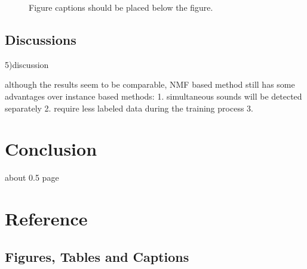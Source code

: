\documentclass{article}
\begin{document}
\begin{figure}
 \centerline{}
 \caption{Figure captions should be placed below the figure.}
 \label{fig:example}
\end{figure}




\subsection{Discussions}\label{subsec:discussions}

5)discussion

although the results seem to be comparable, NMF based method still has some advantages over instance based methods: 1. simultaneous sounds will be detected separately  2. require less labeled data during the training process 3. 




\section{Conclusion}\label{sec:Conclusion}

about 0.5 page


\section{Reference}


\subsection{Figures, Tables and Captions}
\end{document}
